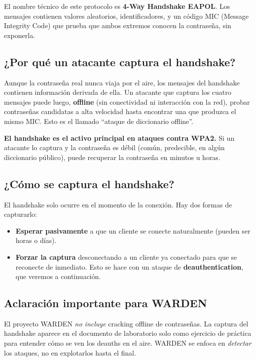 \documentclass[11pt,a4paper]{article}
\begin{document}
El nombre técnico de este protocolo es \textbf{4-Way Handshake EAPOL}. Los
mensajes contienen valores aleatorios, identificadores, y un código MIC
(Message Integrity Code) que prueba que ambos extremos conocen la
contraseña, sin exponerla.

\subsection{¿Por qué un atacante captura el handshake?}
Aunque la contraseña real nunca viaja por el aire, los mensajes del
handshake contienen información derivada de ella. Un atacante que captura
los cuatro mensajes puede luego, \textbf{offline} (sin conectividad ni
interacción con la red), probar contraseñas candidatas a alta velocidad
hasta encontrar una que produzca el mismo MIC. Esto es el llamado ``ataque
de diccionario offline''.

\textbf{El handshake es el activo principal en ataques contra WPA2.} Si un
atacante lo captura y la contraseña es débil (común, predecible, en algún
diccionario público), puede recuperar la contraseña en minutos u horas.

\subsection{¿Cómo se captura el handshake?}
El handshake solo ocurre en el momento de la conexión. Hay dos formas de
capturarlo:

\begin{itemize}
  \item \textbf{Esperar pasivamente} a que un cliente se conecte
    naturalmente (pueden ser horas o días).
  \item \textbf{Forzar la captura} desconectando a un cliente ya conectado
    para que se reconecte de inmediato. Esto se hace con un ataque de
    \textbf{deauthentication}, que veremos a continuación.
\end{itemize}

\subsection{Aclaración importante para WARDEN}
El proyecto WARDEN \emph{no incluye} cracking offline de contraseñas. La
captura del handshake aparece en el documento de laboratorio solo como
ejercicio de práctica para entender cómo se ven los deauths en el aire.
WARDEN se enfoca en \emph{detectar} los ataques, no en explotarlos hasta el
final.
\end{document}
